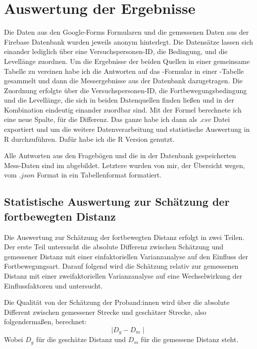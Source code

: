 
        \section{Auswertung der Ergebnisse}
            Die Daten aus den Google-Forms Formularen und die gemessenen Daten aus der Firebase Datenbank wurden jeweils anonym hinterlegt. Die Datensätze lassen sich einander lediglich über eine Versuchspersonen-ID, die Bedingung, und die Levellänge
            zuordnen.
            Um die Ergebnisse der beiden Quellen in einer gemeinsame Tabelle zu vereinen habe ich die Antworten auf das -Formular in einer -Tabelle gesammelt und dann die Messergebnisse aus der Datenbank dazugetragen. Die Zuordnung erfolgte über die Versuchspersonen-ID, die Fortbewegungsbedingung und die Levellänge, die sich in beiden Datenquellen finden ließen und in der Kombination eindeutig einander zuordbar sind.
            Mit der Formel %
            berechnete ich eine neue Spalte, für die Differenz. Das ganze habe ich dann als $.csv$ Datei exportiert und um die weitere Datenverarbeitung und statistische Auswertung in R durchzuführen. Dafür habe ich die R Version  genutzt.

            Alle Antworten aus den Fragebögen und die in der Datenbank gespeicherten Mess-Daten sind im  abgebildet. Letztere wurden von mir, der Übersicht wegen, vom $.json$ Format in ein Tabellenformat formatiert.

                \subsection{Statistische Auswertung zur Schätzung der fortbewegten Distanz}
                    Die Auswertung zur Schätzung der fortbewegten Distanz erfolgt in zwei Teilen.
                    Der erste Teil untersucht die absolute Differenz zwischen Schätzung und gemessener Distanz mit einer einfaktoriellen Varianzanalyse auf den Einfluss der Fortbewegungsart.
                    Darauf folgend wird die Schätzung relativ zur gemessenen Distanz mit einer zweifaktoriellen Varianzanalyse auf eine Wechselwirkung der Einflussfaktoren  und  untersucht.

                    Die Qualität von der Schätzung der Proband:innen wird über die absolute Different zwischen gemessener Strecke und geschätzer Strecke, also folgendermaßen, berechnet:
                    $$ \mid D_g - D_m \mid $$
                    Wobei $D_g$ für die geschätze Distanz und $D_m$ für die gemessene Distanz steht.

